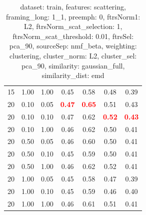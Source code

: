 \begin{table}
\begin{center}
\begin{tabular}{lllcccc}
15 & 1.00 & 1.00 & 0.45 & 0.58 & 0.48 & 0.39 \\ 
20 & 0.10 & 0.05 & \textbf{\textcolor{red}{0.47}} & \textbf{\textcolor{red}{0.65}} & 0.51 & 0.43 \\ 
20 & 0.10 & 0.10 & 0.47 & 0.62 & \textbf{\textcolor{red}{0.52}} & \textbf{\textcolor{red}{0.43}} \\ 
20 & 0.10 & 1.00 & 0.46 & 0.62 & 0.50 & 0.41 \\ 
20 & 0.50 & 0.05 & 0.46 & 0.60 & 0.50 & 0.41 \\ 
20 & 0.50 & 0.10 & 0.45 & 0.59 & 0.50 & 0.41 \\ 
20 & 0.50 & 1.00 & 0.46 & 0.62 & 0.52 & 0.41 \\ 
20 & 1.00 & 0.05 & 0.45 & 0.58 & 0.47 & 0.39 \\ 
20 & 1.00 & 0.10 & 0.45 & 0.59 & 0.46 & 0.40 \\ 
20 & 1.00 & 1.00 & 0.46 & 0.61 & 0.51 & 0.41 \\ 
\end{tabular} 
\end{center} 
\caption{dataset: train, features: scattering, framing\_long: 1\_1, preemph: 0, ftrsNorm1: L2, ftrsNorm\_scat\_selection: 1, ftrsNorm\_scat\_threshold: 0.01, ftrsSel: pca\_90, sourceSep: nmf\_beta, weighting: clustering, cluster\_norm: L2, cluster\_sel: pca\_90, similarity: gaussian\_full, similarity\_dist: emd} 
\label{datasetrFeaturscFraminlong1_1Preemp0Ftrsnorm1L2Ftrsnoscatselect1Ftrsnoscatthresh0.01Ftrsselpc90SourcesepnmbeWeightclClustenormL2Clusteselpc90SimilagafuSimiladistem} 
\end{table} 
 
